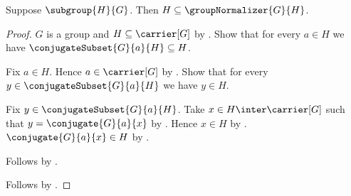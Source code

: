 \begin{theorem}\label{subgroup_subseteq_group_normalizer}
    Suppose $\subgroup{H}{G}$.
    Then $H\subseteq\groupNormalizer{G}{H}$.
\end{theorem}
\begin{proof}
    $G$ is a group and $H\subseteq\carrier[G]$ by
        .
    Show that for every $a\in H$ we have
        $\conjugateSubset{G}{a}{H}\subseteq H$.
    \begin{subproof}
        Fix $a\in H$.
        Hence $a\in\carrier[G]$ by .
        Show that for every $y\in\conjugateSubset{G}{a}{H}$
            we have $y\in H$.
        \begin{subproof}
            Fix $y\in\conjugateSubset{G}{a}{H}$.
            Take $x\in H\inter\carrier[G]$ such that
                $y=\conjugate{G}{a}{x}$ by
                .
            Hence $x\in H$ by .
            $\conjugate{G}{a}{x}\in H$ by
                .
        \end{subproof}
        Follows by .
    \end{subproof}
    Follows by
        .
\end{proof}

